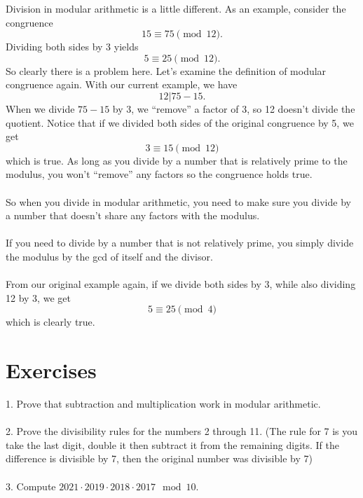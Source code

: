 \documentclass{article}
\begin{document}
Division in modular arithmetic is a little different. As an example, consider the congruence
$$15 \equiv 75 \pmod{12}.$$
Dividing both sides by 3 yields $$5 \equiv 25 \pmod{12}.$$
So clearly there is a problem here.
Let's examine the definition of modular congruence again.
With our current example, we have 
$$12 | 75-15.$$
When we divide $75-15$ by 3, we ``remove'' a factor of 3, so 12 doesn't divide the quotient.
Notice that if we divided both sides of the original congruence by 5, we get 
$$3 \equiv 15 \pmod{12}$$ which is true. As long as you divide by a number that is relatively prime to the modulus,
you won't ``remove'' any factors so the congruence holds true.\\\\
So when you divide in modular arithmetic, you need to make sure you divide by a number that doesn't share any factors with the modulus.
\\\\
If you need to divide by a number that is not relatively prime, you simply divide the modulus by the gcd of itself and the divisor. 
\\\\
From our original example again, if we divide both sides by 3, while also dividing 12 by 3, we get 
$$5 \equiv 25 \pmod{4}$$ which is clearly true.

\section*{Exercises}
1. Prove that subtraction and multiplication work in modular arithmetic.
\\
\\
2. Prove the divisibility rules for the numbers 2 through 11. (The rule for 7 is you take the last digit, double it then subtract it from the remaining digits. If the difference is divisible by 7, then the original number was divisible by 7)
\\
\\
3. Compute $2021 \cdot 2019 \cdot 2018 \cdot 2017 \mod{10}$.
\end{document}
